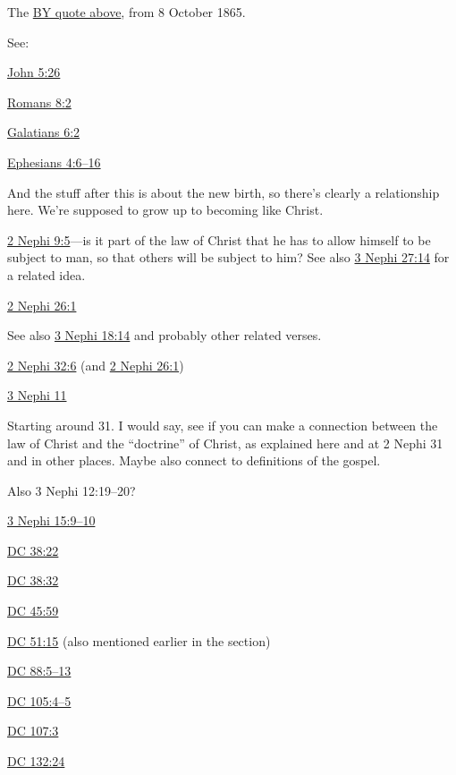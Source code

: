 		The \hyperref[LAW-BY]{BY quote above}, from 8 October 1865.
		
		See:
			\begin{compactitem}
				\item \hyperref[JOHN-5-26]{John 5:26}
				\item \hyperref[ROMANS-8-2]{Romans 8:2}
				\item \hyperref[GALATIANS-6-2]{Galatians 6:2}
				\item \hyperref[EPHESIANS-4-6]{Ephesians 4:6--16}
					\begin{compactitem}
						\item And the stuff after this is about the new birth, so there's clearly a relationship here. We're supposed to grow up to becoming like Christ.
					\end{compactitem}
				\item \hyperref[2NEPHI-9-5]{2 Nephi 9:5}---is it part of the law of Christ that he has to allow himself to be subject to man, so that others will be subject to him? See also \hyperref[3NEPHI-27-14]{3 Nephi 27:14} for a related idea.
				\item \hyperref[2NEPHI-26-1]{2 Nephi 26:1}
					\begin{compactitem}
						\item See also \hyperref[3NEPHI-18-14]{3 Nephi 18:14} and probably other related verses.
					\end{compactitem}
				\item \hyperref[2NEPHI-32-6]{2 Nephi 32:6} (and \hyperref[2NEPHI-26-1]{2 Nephi 26:1})
				\item \hyperref[3NEPHI-11]{3 Nephi 11}
					\begin{compactitem}
						\item Starting around 31. I would say, see if you can make a connection between the law of Christ and the ``doctrine'' of Christ, as explained here and at 2 Nephi 31 and in other places. Maybe also connect to definitions of the gospel.
						\item Also 3 Nephi 12:19--20?
					\end{compactitem}
				\item \hyperref[3NEPHI-15-9]{3 Nephi 15:9--10}
				\item \hyperref[DC38-22]{DC 38:22}
				\item \hyperref[DC38-32]{DC 38:32}
				\item \hyperref[DC45-59]{DC 45:59}
				\item \hyperref[DC51-15]{DC 51:15} (also mentioned earlier in the section)
				\item \hyperref[DC88-5]{DC 88:5--13}
				\item \hyperref[DC105-4]{DC 105:4--5}
				\item \hyperref[DC107-3]{DC 107:3}
				\item \hyperref[DC132-24]{DC 132:24}
			\end{compactitem}